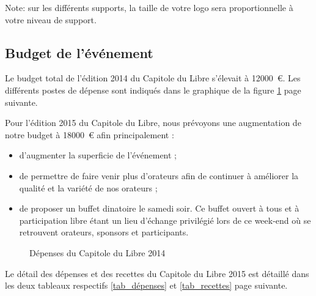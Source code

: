Note: sur les différents supports, la taille de votre logo sera proportionnelle à votre niveau de support.

	\subsection{Budget de l’événement}

Le budget total de l'édition 2014 du Capitole du Libre s'élevait à \SI{12000}{\euro}. Les différents postes de dépense sont indiqués dans le graphique de la figure \ref{fig_budget} page suivante.

Pour l'édition 2015 du Capitole du Libre, nous prévoyons une augmentation de notre budget à \SI{18000}{€} afin principalement :
\begin{itemize}[label=$\bullet$]
\item d'augmenter la superficie de l'événement ;
\item de permettre de faire venir plus d'orateurs afin de continuer à améliorer la qualité et la variété de nos orateurs ;
\item de proposer un buffet dinatoire le samedi soir. Ce buffet ouvert à tous et à participation libre étant un lieu d'échange privilégié lors de ce week-end où se retrouvent orateurs, sponsors et participants.
\end{itemize}

\begin{figure}
\begin{center}
\end{center}
\caption{Dépenses du Capitole du Libre 2014}\label{fig_budget}
\end{figure}

\Separateur

Le détail des dépenses et des recettes du Capitole du Libre 2015 est détaillé dans les deux tableaux respectifs \ref{tab_dépenses} et \ref{tab_recettes} page suivante.

